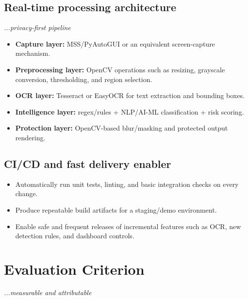 \documentclass[12pt,a4paper]{article}
\begin{document}
\subsection{Real-time processing architecture}
\hfill{\itshape\fontsize{8.3}{9.5}\selectfont ...privacy-first pipeline}

\begin{itemize}
    \item \textbf{Capture layer:} MSS/PyAutoGUI or an equivalent screen-capture mechanism.

    \item \textbf{Preprocessing layer:} OpenCV operations such as resizing, grayscale conversion, thresholding, and region selection.

    \item \textbf{OCR layer:} Tesseract or EasyOCR for text extraction and bounding boxes.

    \item \textbf{Intelligence layer:} regex/rules + NLP/AI-ML classification + risk scoring.

    \item \textbf{Protection layer:} OpenCV-based blur/masking and protected output rendering.
\end{itemize}

\subsection{CI/CD and fast delivery enabler}

\begin{itemize}
    \item Automatically run unit tests, linting, and basic integration checks on every change.

    \item Produce repeatable build artifacts for a staging/demo environment.

    \item Enable safe and frequent releases of incremental features such as OCR, new detection rules, and dashboard controls.
\end{itemize}

\newpage


\section{Evaluation Criterion}
\hfill{\itshape\fontsize{8.3}{9.5}\selectfont ...measurable and attributable}
\end{document}
